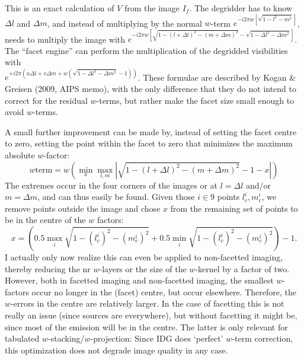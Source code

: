 \documentclass[a4paper,10pt]{article}
\begin{document}
This is an exact calculation of $V$ from the image $I_f$. The degridder has to know $\Delta l$ and $\Delta m$, and instead of multiplying by the normal $w$-term $e^{-i2\pi w\left[ \sqrt{1-l^2-m^2}\right]}$, needs to multiply the image with $e^{-i2\pi w\left[ \sqrt{1-(l+\Delta l)^2-(m+\Delta m)^2} - \sqrt{1 - \Delta l^2 - \Delta m^2} \right]}$. The ``facet engine'' can perform the multiplication of the degridded visibilities with\\
$e^{+i 2\pi \left(u\Delta l + v\Delta m + w(\sqrt{1 - \Delta l^2 - \Delta m^2}-1)\right)}$. These formulae are described by Kogan \& Greisen (2009, AIPS memo), with the only difference that they do not intend to correct for the residual $w$-terms, but rather make the facet size small enough to avoid $w$-terms.

A small further improvement can be made by, instead of setting the facet centre to zero, setting the point within the facet to zero that minimizes the maximum absolute $w$-factor:
\begin{equation}
 w\textrm{term} = w \left( \min\limits_{x} \max\limits_{l,m} \left| \sqrt {1-(l+\Delta l)^2-(m+\Delta m)^2} - 1 - x \right| \right)
\end{equation}
The extremes occur in the four corners of the images or at $l=\Delta l$ and/or $m=\Delta m$, and can thus easily be found. Given those $i \in 9$ points $l_c^i,m_c^i$, we remove points outside the image and chose $x$ from the remaining set of points to be in the centre of the $w$ factors:
\begin{equation} \label{eq:optimization}
 x = \left( 0.5 \max_i \sqrt {1-(l_c^i)^2-(m_c^i)^2} + 0.5 \min_i \sqrt {1-(l_c^i)^2-(m_c^i)^2}\right) - 1.
\end{equation}
I actually only now realize this can even be applied to non-facetted imaging, thereby reducing the nr $w$-layers or the size of the $w$-kernel by a factor of two. However, both in facetted imaging and non-facetted imaging, the smallest $w$-factors occur no longer in the (facet) centre, but occur elsewhere. Therefore, the $w$-errors in the centre are relatively larger. In the case of facetting this is not really an issue (since sources are everywhere), but without facetting it might be, since most of the emission will be in the centre. The latter is only relevant for tabulated $w$-stacking/$w$-projection: Since IDG does `perfect' $w$-term correction, this optimization does not degrade image quality in any case.
\end{document}
